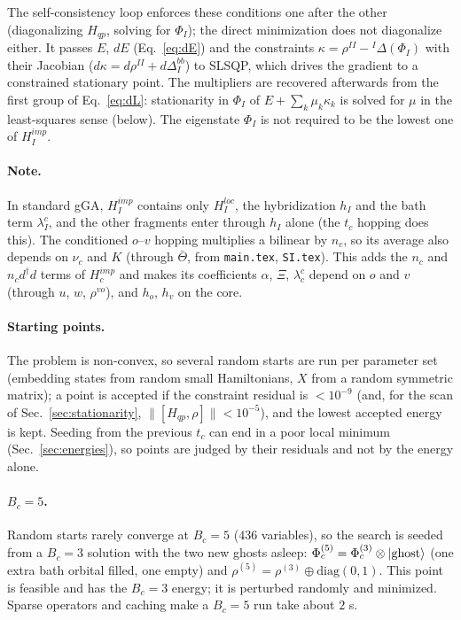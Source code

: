 \documentclass[11pt]{article}
\newcommand{\dg}{^{\dagger}}
\newcommand{\ket}[1]{|#1\rangle}
\begin{document}
The self-consistency loop enforces these conditions one after the other (diagonalizing $H_{qp}$, solving for $\Phi_I$); the direct minimization does not diagonalize either. It passes $E$, $dE$ (Eq.~\eqref{eq:dE}) and the constraints $\kappa=\rho^{II}-{}^I\Delta(\Phi_I)$
with their Jacobian ($d\kappa=d\rho^{II}+d\Delta^{bb}_I$) to SLSQP, which drives the gradient to a constrained stationary point. The multipliers are recovered afterwards from the first group of Eq.~\eqref{eq:dL}: stationarity in $\Phi_I$
of $E+\sum_k\mu_k\kappa_k$ is solved for $\mu$ in the least-squares sense (below). The eigenstate $\Phi_I$ is not required to be the lowest one of $H^{imp}_I$.

\paragraph{Note.} In standard gGA, $H^{imp}_I$ contains only $H^{loc}_I$, the hybridization $h_I$ and the bath term $\lambda^c_I$, and the other fragments enter through $h_I$ alone (the $t_c$ hopping does this).
The conditioned $o$--$v$ hopping multiplies a bilinear by $n_c$, so its average also depends on $\nu_c$ and $K$ (through $\bar\Theta$, from \texttt{main.tex}, \texttt{SI.tex}). This adds the $n_c$ and $n_cd\dg d$ terms of $H^{imp}_c$ and makes its
coefficients $\alpha$, $\Xi$, $\lambda^c_c$ depend on $o$ and $v$ (through $u$, $w$, $\rho^{vo}$), and $h_o$, $h_v$ on the core.

\paragraph{Starting points.} The problem is non-convex, so several random starts are run per parameter set (embedding states from
random small Hamiltonians, $X$ from a random symmetric matrix); a point is accepted if the constraint residual is $<10^{-9}$ (and, for the scan of Sec.~\ref{sec:stationarity}, $\|[H_{qp},\rho]\|<10^{-5}$), and
the lowest accepted energy is kept. Seeding from the previous $t_c$ can end in a poor local minimum (Sec.~\ref{sec:energies}), so points
are judged by their residuals and not by the energy alone.

\paragraph{$B_c=5$.} Random starts rarely converge at $B_c=5$ ($436$ variables), so the search is seeded from a $B_c=3$ solution
with the two new ghosts asleep: $\Phi_c^{(5)}=\Phi_c^{(3)}\otimes\ket{\rm ghost}$ (one extra bath orbital filled, one empty) and
$\rho^{(5)}=\rho^{(3)}\oplus\mathrm{diag}(0,1)$. This point is feasible and has the $B_c=3$ energy; it is perturbed randomly and
minimized. Sparse operators and caching make a $B_c=5$ run take about $2$ s.
\end{document}
